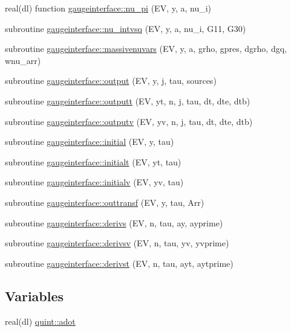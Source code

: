 \begin{DoxyCompactItemize}
\item 
real(dl) function \mbox{\hyperlink{namespacegaugeinterface_a33373e2888fd46e2c443d7e8c2785639}{gaugeinterface\+::nu\+\_\+pi}} (EV, y, a, nu\+\_\+i)
\item 
subroutine \mbox{\hyperlink{namespacegaugeinterface_a2e8822823d298cb0912b5ec22ea4a6ff}{gaugeinterface\+::nu\+\_\+intvsq}} (EV, y, a, nu\+\_\+i, G11, G30)
\item 
subroutine \mbox{\hyperlink{namespacegaugeinterface_ae4228ed9cfb9382025eb84617b0ed091}{gaugeinterface\+::massivenuvars}} (EV, y, a, grho, gpres, dgrho, dgq, wnu\+\_\+arr)
\item 
subroutine \mbox{\hyperlink{namespacegaugeinterface_ac370c67bc9750bf5749a69531fe3ffc1}{gaugeinterface\+::output}} (EV, y, j, tau, sources)
\item 
subroutine \mbox{\hyperlink{namespacegaugeinterface_a5235d59ec77fa4b3a41d9754c8e447ca}{gaugeinterface\+::outputt}} (EV, yt, n, j, tau, dt, dte, dtb)
\item 
subroutine \mbox{\hyperlink{namespacegaugeinterface_ad9126befa5df67da981345f6230fede4}{gaugeinterface\+::outputv}} (EV, yv, n, j, tau, dt, dte, dtb)
\item 
subroutine \mbox{\hyperlink{namespacegaugeinterface_aa05aaad2bec1907778ea8eae3a7ba521}{gaugeinterface\+::initial}} (EV, y, tau)
\item 
subroutine \mbox{\hyperlink{namespacegaugeinterface_afbc0a211756e4b923725483b6c961e75}{gaugeinterface\+::initialt}} (EV, yt, tau)
\item 
subroutine \mbox{\hyperlink{namespacegaugeinterface_aeed464df3ecab21d57bcb789fe3b1a22}{gaugeinterface\+::initialv}} (EV, yv, tau)
\item 
subroutine \mbox{\hyperlink{namespacegaugeinterface_ae920635485c908177072c6cad0d49f59}{gaugeinterface\+::outtransf}} (EV, y, tau, Arr)
\item 
subroutine \mbox{\hyperlink{namespacegaugeinterface_a1d317261c83f3b5e84fe401ac2436d44}{gaugeinterface\+::derivs}} (EV, n, tau, ay, ayprime)
\item 
subroutine \mbox{\hyperlink{namespacegaugeinterface_a25ee0c9e055aabce6b7eb205e65f9804}{gaugeinterface\+::derivsv}} (EV, n, tau, yv, yvprime)
\item 
subroutine \mbox{\hyperlink{namespacegaugeinterface_ab2ff4cd74364457862a7ff44fb2ca978}{gaugeinterface\+::derivst}} (EV, n, tau, ayt, aytprime)
\end{DoxyCompactItemize}
\subsection*{Variables}
\begin{DoxyCompactItemize}
\item 
real(dl) \mbox{\hyperlink{namespacequint_a0574a45f7095364017aa3ff788ea374a}{quint\+::adot}}
\end{DoxyCompactItemize}


